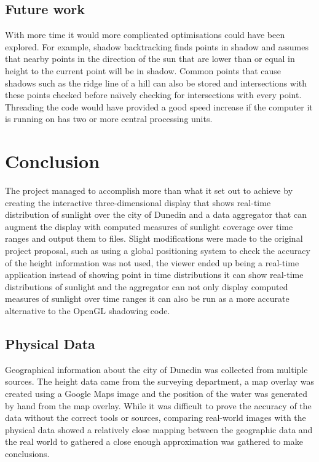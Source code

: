 \documentclass[12pt]{report}
\begin{document}
\section{Future work}
With more time it would more complicated optimisations could have been explored. For example, shadow backtracking
finds points in shadow and assumes that nearby points in the direction of the sun that are lower than or equal in height to the current point will be in shadow. Common points that cause shadows such as the ridge line of a hill can also be stored and intersections with these points checked before na\"{\i}vely checking for intersections with every point. Threading the code would have provided a good speed increase if the computer it is running on has two or more central processing units.


\chapter{Conclusion}
The project managed to accomplish more than what it set out to achieve by creating the interactive three-dimensional display that shows real-time distribution of sunlight over the city of Dunedin and a data aggregator that can augment the display with computed measures of sunlight coverage over time ranges and output them to files. Slight modifications were made to the original project proposal, such as using a global positioning system to check the accuracy of the height information was not used, the viewer ended up being a real-time application instead of showing point in time distributions it can show real-time distributions of sunlight and the aggregator can not only display computed measures of sunlight over time ranges it can also be run as a more accurate alternative to the OpenGL shadowing code.

\section{Physical Data}
Geographical information about the city of Dunedin was collected from multiple sources. The height data came from the surveying department, a map overlay was created using a Google Maps\cite{gmaps} image and the position of the water was generated by hand from the map overlay. While it was difficult to prove the accuracy of the data without the correct tools or sources, comparing real-world images with the physical data showed a relatively close mapping between the geographic data and the real world to  gathered a close enough approximation was gathered to make conclusions. 
\end{document}
